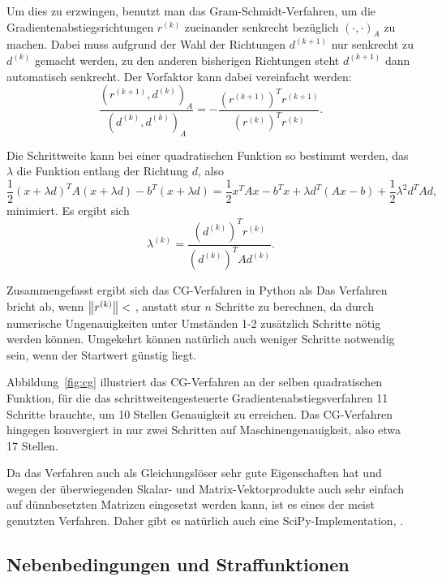 Um dies zu erzwingen, benutzt man das Gram-Schmidt-Verfahren, um die
Gradientenabstiegsrichtungen $r^{(k)}$ zueinander senkrecht bezüglich
$(\cdot,\cdot)_A$ zu machen. Dabei muss aufgrund der Wahl der
Richtungen $d^{(k+1)}$ nur senkrecht zu $d^{(k)}$ gemacht werden, zu
den anderen bisherigen Richtungen steht $d^{(k+1)}$ dann automatisch
senkrecht. Der Vorfaktor kann dabei vereinfacht werden:
\begin{equation}
  \frac{(r^{(k+1)}, d^{(k)})_A}{(d^{(k)}, d^{(k)})_A}
  = -\frac{\left(r^{(k+1)}\right)^Tr^{(k+1)}}{\left(r^{(k)}\right)^Tr^{(k)}}.
\end{equation}

Die Schrittweite kann bei einer quadratischen Funktion so bestimmt
werden, das $\lambda$ die Funktion entlang der Richtung $d$, also
\begin{equation}
  \frac{1}{2}(x+\lambda d)^TA(x+\lambda d) - b^T(x+\lambda d)
  =  \frac{1}{2}x^TAx - b^Tx + \lambda d^T(Ax - b) + \frac{1}{2}\lambda^2 d^TAd,
\end{equation}
minimiert. Es ergibt sich
\begin{equation}
  \lambda^{(k)}  =  \frac{\left(d^{(k)}\right)^Tr^{(k)}}{\left(d^{(k)}\right)^TAd^{(k)}}.
\end{equation}

Zusammengefasst ergibt sich das CG-Verfahren in Python als
%
Das Verfahren bricht ab, wenn $\left\lVert{r^{(k)}}\right\rVert <$ , anstatt
stur $n$ Schritte zu berechnen, da durch numerische Ungenauigkeiten
unter Umständen 1-2 zusätzlich Schritte nötig werden können. Umgekehrt
können natürlich auch weniger Schritte notwendig sein, wenn der
Startwert günstig liegt.

Abbildung~\ref{fig:cg} illustriert das CG-Verfahren an der selben
quadratischen Funktion, für die das schrittweitengesteuerte
Gradientenabstiegsverfahren 11 Schritte brauchte, um 10 Stellen
Genauigkeit zu erreichen. Das CG-Verfahren hingegen konvergiert in nur
zwei Schritten auf Maschinengenauigkeit, also etwa 17 Stellen.

Da das Verfahren auch als Gleichungslöser sehr gute Eigenschaften hat
und wegen der überwiegenden Skalar- und Matrix-Vektorprodukte auch
sehr einfach auf dünnbesetzten Matrizen eingesetzt werden kann, ist es
eines der meist genutzten Verfahren. Daher gibt es natürlich auch eine
SciPy-Implementation, .

\subsection{Nebenbedingungen und Straffunktionen}

